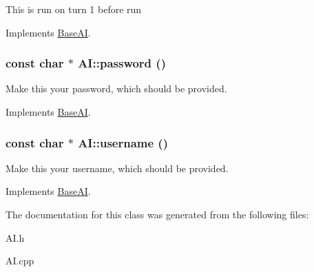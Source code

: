 This is run on turn 1 before run 

Implements \hyperlink{classBaseAI_90ce8becd6f2e32c2cc32d41145e88df}{BaseAI}.\hypertarget{classAI_a4e58e11bbbdb040e6b12f8706763a00}{
\subsubsection[{password}]{\setlength{\rightskip}{0pt plus 5cm}const char $\ast$ AI::password ()}}
\label{classAI_a4e58e11bbbdb040e6b12f8706763a00}


Make this your password, which should be provided. 

Implements \hyperlink{classBaseAI_9251e20447917cda64ad1487b903456f}{BaseAI}.\hypertarget{classAI_529ac74a6f88a82abb1edd87847203e1}{
\subsubsection[{username}]{\setlength{\rightskip}{0pt plus 5cm}const char $\ast$ AI::username ()}}
\label{classAI_529ac74a6f88a82abb1edd87847203e1}


Make this your username, which should be provided. 

Implements \hyperlink{classBaseAI_ef082fbf306fec04515ed5ed3b1ba582}{BaseAI}.

The documentation for this class was generated from the following files:\begin{CompactItemize}
\item 
AI.h\item 
AI.cpp\end{CompactItemize}
